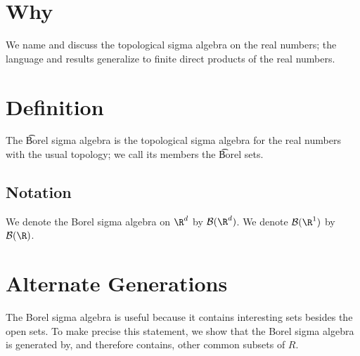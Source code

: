 
\section*{Why}

We name and discuss the topological sigma algebra on the real numbers; the language and results generalize to finite direct products of the real numbers.

\section*{Definition}

The \t{Borel sigma algebra} is the topological sigma algebra for the real numbers with the usual topology; we call its members the \t{Borel sets}.

\subsection*{Notation}

We denote the Borel sigma algebra on $\R ^d$ by $\mathcal{B} (\R ^d)$.
We denote $\mathcal{B} (\R ^1)$ by $\mathcal{B} (\R )$.

\section*{Alternate Generations}

The Borel sigma algebra is useful because it contains interesting sets besides the open sets.
To make precise this statement, we show that the Borel sigma algebra is generated by, and therefore contains, other common subsets of $R$.

